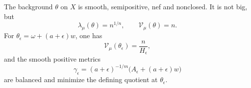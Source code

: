 \begin{theorem}\label{thm:radial-positive-volume-nonbig}
The background $\theta$ on $X$ is smooth, semipositive, nef and nonclosed. It is not big, but
\begin{equation}\label{eq:radial-positive-volume-nonbig}
 \lambda_\mu(\theta)=n^{1/n},\qquad\mathcal V_\mu(\theta)=n.
\end{equation}
For $\theta_\epsilon=\omega+(a+\epsilon)w$, one has
\[
 \mathcal V_\mu(\theta_\epsilon)=\frac n{H_\epsilon},
\]
and the smooth positive metrics
\begin{equation}\label{eq:radial-volume-minimizing-metrics}
 \gamma_\epsilon=(a+\epsilon)^{-1/m}
                 \bigl(A_\epsilon+(a+\epsilon)w\bigr)
\end{equation}
are balanced and minimize the defining quotient at $\theta_\epsilon$.
\end{theorem}
